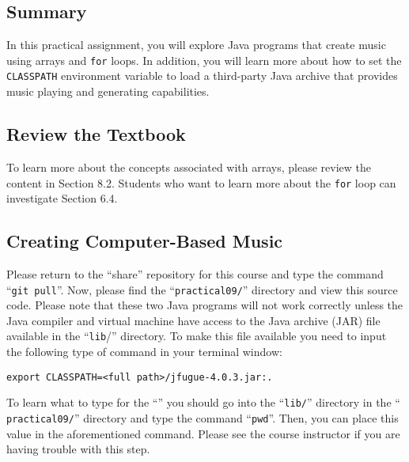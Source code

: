 



\subsection*{Summary}
\vspace*{-.05in}

In this practical assignment, you will explore Java programs that create music using arrays and {\tt for} loops. In
addition, you will learn more about how to set the {\tt CLASSPATH} environment variable to load a third-party Java
archive that provides music playing and generating capabilities.

\vspace*{-.1in}
\subsection*{Review the Textbook}
\vspace*{-.05in}

To learn more about the concepts associated with arrays, please review the content in Section 8.2. Students who want to
learn more about the {\tt for} loop can investigate Section 6.4.

\vspace*{-.1in}
\subsection*{Creating Computer-Based Music}
\vspace*{-.05in}

Please return to the ``share'' repository for this course and type the command ``{\tt git pull}''. Now, please find the
``{\tt practical09/}'' directory and view this source code. Please note that these two Java programs will not work
correctly unless the Java compiler and virtual machine have access to the Java archive (JAR) file available in the
``{\tt lib}/'' directory. To make this file available you need to input the following type of command in your terminal
window: 

  {\tt export CLASSPATH=<full path>/jfugue-4.0.3.jar:.}

  To learn what to type for the ``{\tt <full path>}'' you should go into the ``{\tt lib/}'' directory in the ``{\tt
practical09/}'' directory and type the command ``{\tt pwd}''.  Then, you can place this value in the aforementioned
command. Please see the course instructor if you are having trouble with this step.

